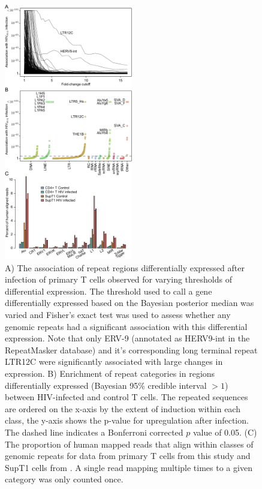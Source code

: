 \documentclass[../sherrill-Mix_thesis.tex]{subfiles}
\begin{document}
		\begin{figure}
			\centering
				\includegraphics[width=0.5\textwidth]{ltrCombo.pdf}
			\caption[Repeat categories enriched upon infection with HIV.]{A) The association of repeat regions differentially expressed after \hivEight{} infection of primary T cells observed for varying thresholds of differential expression. The threshold used to call a gene differentially expressed based on the Bayesian posterior median was varied and Fisher's exact test was used to assess whether any genomic repeats had a significant association with this differential expression. Note that only ERV-9 (annotated as HERV9-int in the RepeatMasker database) and it's corresponding long terminal repeat LTR12C were significantly associated with large changes in expression. B) Enrichment of repeat categories in regions differentially expressed (Bayesian 95\% credible interval $>1$) between HIV-infected and control \cdFour{} T cells. The repeated sequences are ordered on the x-axis by the extent of induction within each class, the y-axis shows the p-value for upregulation after infection. The dashed line indicates a Bonferroni corrected $p$ value of 0.05. (C) The proportion of human mapped reads that align within classes of genomic repeats for data from primary \cdFour{} T cells from this study and SupT1 cells from \citet{Chang2011}. A single read mapping multiple times to a given category was only counted once.}
			\label{figHervs}
		\end{figure}
\end{document}
